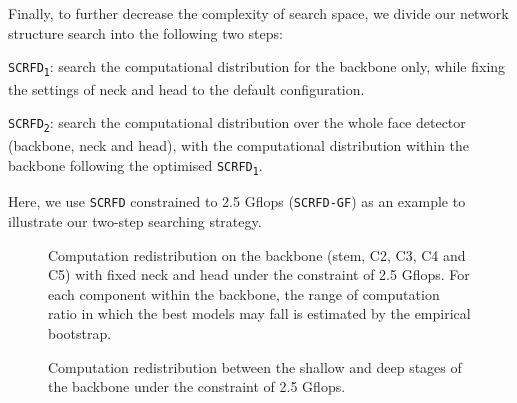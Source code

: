\documentclass[10pt,twocolumn,letterpaper]{article}
\newcommand{\dsname}[1]{\texttt{\small #1}\xspace}
\newcommand{\scrfd}{\dsname{SCRFD}}
\newcommand{\scrfdv}[1]{\dsname{SCRFD\textsubscript{#1}}}
\newcommand{\scrfdf}[1]{\dsname{SCRFD-\text{#1}GF}}
\newenvironment{tight_itemize}{
\begin{itemize}[leftmargin=20pt]
  \setlength{\topsep}{0pt}
  \setlength{\itemsep}{0pt}
  \setlength{\parskip}{0pt}
  \setlength{\parsep}{0pt}
}{\end{itemize}}
\begin{document}
Finally, to further decrease the complexity of search space, we divide our network structure search into the following two steps:
\begin{tight_itemize}
\item \scrfdv{1}: search the computational distribution for the backbone only, while fixing the settings of neck and head to the default configuration.
\item \scrfdv{2}: search the computational distribution over the whole face detector (\ie backbone, neck and head), with the computational distribution within the backbone following the optimised \scrfdv{1}. 
\end{tight_itemize}
Here, we use \scrfd constrained to 2.5 Gflops (\scrfdf{2.5}) as an example to illustrate our two-step searching strategy.

\begin{figure*}
\centering
{}
\caption{Computation redistribution on the backbone (stem, C2, C3, C4 and C5) with fixed neck and head under the constraint of 2.5 Gflops. 
For each component within the backbone, the range of computation ratio in which the best models may fall is estimated by the empirical bootstrap. }
\label{fig:computationoptimizationbackbone}
\end{figure*}

\begin{figure}[h]
\centering
{}
\caption{Computation redistribution between the shallow and deep stages of the backbone under the constraint of 2.5 Gflops.}
\label{fig:computationoptimizationlowhigh}
\end{figure}
\end{document}
